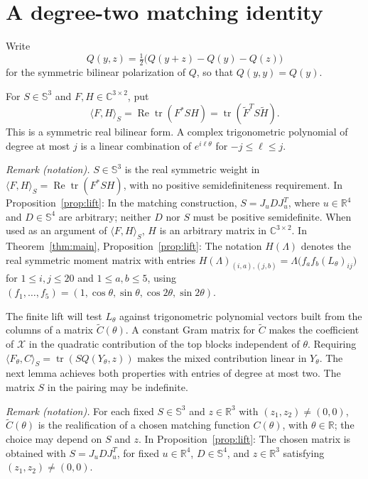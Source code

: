 \section{A degree-two matching identity}\label{sec:matching}

Write
\[
 Q(y,z)=\tfrac12\bigl(Q(y+z)-Q(y)-Q(z)\bigr)
\]
for the symmetric bilinear polarization of $Q$, so that $Q(y,y)=Q(y)$.

For $S\in\mathbb S^3$ and $F,H\in\mathbb C^{3\times2}$, put
\[
 \langle F,H\rangle_S
 =\operatorname{Re}\operatorname{tr}(F^*SH)
 =\operatorname{tr}(\widetilde F^T S\widetilde H).
\]
This is a symmetric real bilinear form.  A complex trigonometric
polynomial of degree at most $j$ is a linear combination of
$e^{i\ell\theta}$ for $-j\leq\ell\leq j$.

\noindent\textit{Remark (notation).} $S\in\mathbb S^3$ is the real symmetric weight in $\langle F,H\rangle_S=\operatorname{Re}\operatorname{tr}(F^*SH)$, with no positive semidefiniteness requirement. In Proposition~\ref{prop:lift}: In the matching construction, $S=J_uDJ_u^T$, where $u\in\mathbb R^4$ and $D\in\mathbb S^4$ are arbitrary; neither $D$ nor $S$ must be positive semidefinite. When used as an argument of $\langle F,H\rangle_S$, $H$ is an arbitrary matrix in $\mathbb C^{3\times2}$. In Theorem~\ref{thm:main}, Proposition~\ref{prop:lift}: The notation $H(\Lambda)$ denotes the real symmetric moment matrix with entries $H(\Lambda)_{(i,a),(j,b)}=\Lambda\bigl(f_a f_b(L_\theta)_{ij}\bigr)$ for $1\leq i,j\leq20$ and $1\leq a,b\leq5$, using $(f_1,\ldots,f_5)=(1,\cos\theta,\sin\theta,\cos2\theta,\sin2\theta)$.


The finite lift will test $L_\theta$ against trigonometric polynomial
vectors built from the columns of a matrix $\widetilde C(\theta)$.
A constant Gram matrix for $\widetilde C$ makes the coefficient of
$\mathcal X$ in the quadratic contribution of the top blocks independent
of $\theta$. Requiring
$\langle F_\theta,C\rangle_S=\operatorname{tr}(SQ(Y_\theta,z))$
makes the mixed contribution linear in $Y_\theta$.
The next lemma achieves both properties with entries of
degree at most two. The matrix $S$ in the pairing may be indefinite.

\noindent\textit{Remark (notation).} For each fixed $S\in\mathbb S^3$ and $z\in\mathbb R^3$ with $(z_1,z_2)\ne(0,0)$, $\widetilde C(\theta)$ is the realification of a chosen matching function $C(\theta)$, with $\theta\in\mathbb R$; the choice may depend on $S$ and $z$. In Proposition~\ref{prop:lift}: The chosen matrix is obtained with $S=J_uDJ_u^T$, for fixed $u\in\mathbb R^4$, $D\in\mathbb S^4$, and $z\in\mathbb R^3$ satisfying $(z_1,z_2)\ne(0,0)$.


